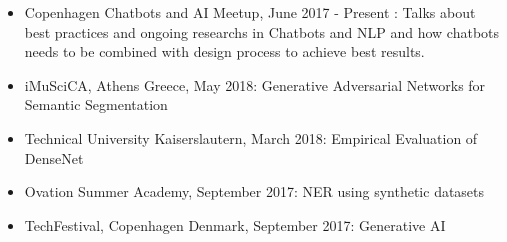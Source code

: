 \documentclass[10pt,letterpaper]{article}
\begin{document}
\begin{itemize}
	\parskip=0.1em
	
	\item Copenhagen Chatbots and AI Meetup, June 2017 - Present : Talks about best practices and ongoing researchs in Chatbots and NLP and how chatbots needs to be combined with design process to achieve best results.
	
	\item iMuSciCA, Athens Greece, May 2018: Generative Adversarial Networks for Semantic Segmentation 
	
	\item Technical University Kaiserslautern, March 2018: Empirical Evaluation of DenseNet 
		
	\item Ovation Summer Academy, September 2017: NER using synthetic datasets 
	
	\item TechFestival, Copenhagen Denmark, September 2017: Generative AI 
	
	
\end{itemize}
\end{document}
